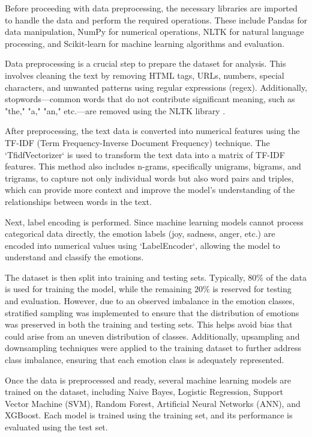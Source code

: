 Before proceeding with data preprocessing, the necessary libraries are imported to handle the data and perform the required operations. These include Pandas for data manipulation, NumPy for numerical operations, NLTK for natural language processing, and Scikit-learn for machine learning algorithms and evaluation.

Data preprocessing is a crucial step to prepare the dataset for analysis. This involves cleaning the text by removing HTML tags, URLs, numbers, special characters, and unwanted patterns using regular expressions (regex). Additionally, stopwords—common words that do not contribute significant meaning, such as "the," "a," "an," etc.—are removed using the NLTK library \cite{opinosis2024stopwords}.

After preprocessing, the text data is converted into numerical features using the TF-IDF (Term Frequency-Inverse Document Frequency) technique. The `TfidfVectorizer` is used to transform the text data into a matrix of TF-IDF features. This method also includes n-grams, specifically unigrams, bigrams, and trigrams, to capture not only individual words but also word pairs and triples, which can provide more context and improve the model's understanding of the relationships between words in the text.

Next, label encoding is performed. Since machine learning models cannot process categorical data directly, the emotion labels (joy, sadness, anger, etc.) are encoded into numerical values using `LabelEncoder`, allowing the model to understand and classify the emotions.

The dataset is then split into training and testing sets. Typically, 80\% of the data is used for training the model, while the remaining 20\% is reserved for testing and evaluation. However, due to an observed imbalance in the emotion classes, stratified sampling was implemented to ensure that the distribution of emotions was preserved in both the training and testing sets. This helps avoid bias that could arise from an uneven distribution of classes. Additionally, upsampling and downsampling techniques were applied to the training dataset to further address class imbalance, ensuring that each emotion class is adequately represented.

Once the data is preprocessed and ready, several machine learning models are trained on the dataset, including Naive Bayes, Logistic Regression, Support Vector Machine (SVM), Random Forest, Artificial Neural Networks (ANN), and XGBoost. Each model is trained using the training set, and its performance is evaluated using the test set.

